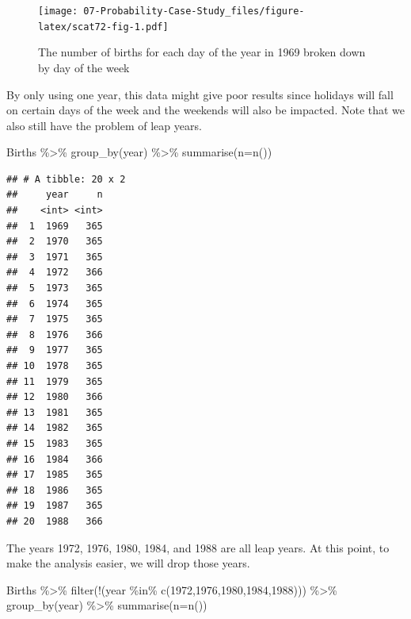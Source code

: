 \documentclass[
]{book}
\newenvironment{Shaded}{\begin{snugshade}}{\end{snugshade}}
\newcommand{\AttributeTok}[1]{\textcolor[rgb]{0.77,0.63,0.00}{#1}}
\newcommand{\DecValTok}[1]{\textcolor[rgb]{0.00,0.00,0.81}{#1}}
\newcommand{\FunctionTok}[1]{\textcolor[rgb]{0.00,0.00,0.00}{#1}}
\newcommand{\NormalTok}[1]{#1}
\newcommand{\SpecialCharTok}[1]{\textcolor[rgb]{0.00,0.00,0.00}{#1}}
\begin{document}
\begin{figure}
\centering
\texttt{[image: 07-Probability-Case-Study\_files/figure-latex/scat72-fig-1.pdf]}
\caption{\label{fig:scat72-fig}The number of births for each day of the year in 1969 broken down by day of the week}
\end{figure}

By only using one year, this data might give poor results since holidays will fall on certain days of the week and the weekends will also be impacted. Note that we also still have the problem of leap years.

\begin{Shaded}
\begin{Highlighting}[]
\NormalTok{Births }\SpecialCharTok{\%\textgreater{}\%}
  \FunctionTok{group\_by}\NormalTok{(year) }\SpecialCharTok{\%\textgreater{}\%}
  \FunctionTok{summarise}\NormalTok{(}\AttributeTok{n=}\FunctionTok{n}\NormalTok{())}
\end{Highlighting}
\end{Shaded}

\begin{verbatim}
## # A tibble: 20 x 2
##     year     n
##    <int> <int>
##  1  1969   365
##  2  1970   365
##  3  1971   365
##  4  1972   366
##  5  1973   365
##  6  1974   365
##  7  1975   365
##  8  1976   366
##  9  1977   365
## 10  1978   365
## 11  1979   365
## 12  1980   366
## 13  1981   365
## 14  1982   365
## 15  1983   365
## 16  1984   366
## 17  1985   365
## 18  1986   365
## 19  1987   365
## 20  1988   366
\end{verbatim}

The years 1972, 1976, 1980, 1984, and 1988 are all leap years. At this point, to make the analysis easier, we will drop those years.

\begin{Shaded}
\begin{Highlighting}[]
\NormalTok{Births }\SpecialCharTok{\%\textgreater{}\%}
  \FunctionTok{filter}\NormalTok{(}\SpecialCharTok{!}\NormalTok{(year }\SpecialCharTok{\%in\%} \FunctionTok{c}\NormalTok{(}\DecValTok{1972}\NormalTok{,}\DecValTok{1976}\NormalTok{,}\DecValTok{1980}\NormalTok{,}\DecValTok{1984}\NormalTok{,}\DecValTok{1988}\NormalTok{))) }\SpecialCharTok{\%\textgreater{}\%}
  \FunctionTok{group\_by}\NormalTok{(year) }\SpecialCharTok{\%\textgreater{}\%}
  \FunctionTok{summarise}\NormalTok{(}\AttributeTok{n=}\FunctionTok{n}\NormalTok{())}
\end{Highlighting}
\end{Shaded}
\end{document}
